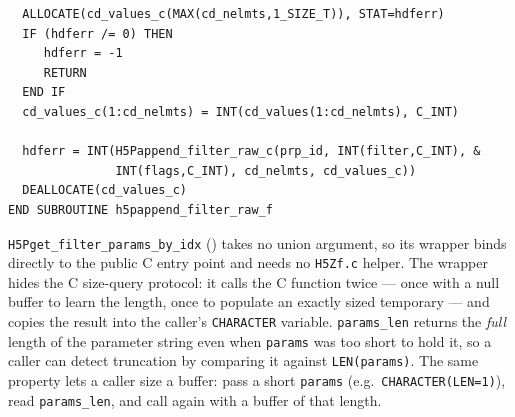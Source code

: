 \documentclass[../RFC-HDFG-2026-001.tex]{subfiles}
\begin{document}
\begin{verbatim}
  ALLOCATE(cd_values_c(MAX(cd_nelmts,1_SIZE_T)), STAT=hdferr)
  IF (hdferr /= 0) THEN
     hdferr = -1
     RETURN
  END IF
  cd_values_c(1:cd_nelmts) = INT(cd_values(1:cd_nelmts), C_INT)

  hdferr = INT(H5Pappend_filter_raw_c(prp_id, INT(filter,C_INT), &
               INT(flags,C_INT), cd_nelmts, cd_values_c))
  DEALLOCATE(cd_values_c)
END SUBROUTINE h5pappend_filter_raw_f
\end{verbatim}


\texttt{H5Pget\_filter\_params\_by\_idx} () takes
no union argument, so its wrapper binds directly to the public C entry point
and needs no \texttt{H5Zf.c} helper.  The wrapper hides the C size-query
protocol: it calls the C function twice --- once with a null buffer to learn
the length, once to populate an exactly sized temporary --- and copies the
result into the caller's \texttt{CHARACTER} variable.  \texttt{params\_len}
returns the \emph{full} length of the parameter string even when
\texttt{params} was too short to hold it, so a caller can detect truncation by
comparing it against \texttt{LEN(params)}.  The same property lets a
caller size a buffer: pass a short \texttt{params} (e.g.\
\texttt{CHARACTER(LEN=1)}), read \texttt{params\_len}, and call again with a
buffer of that length.
\end{document}
